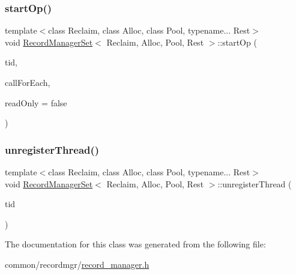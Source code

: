 \mbox{\label{classRecordManagerSet_a4cde1849fa081f1b83a82b3f77711ab9}} 
\subsubsection{\texorpdfstring{start\+Op()}{startOp()}}
{\footnotesize\ttfamily template$<$class Reclaim, class Alloc, class Pool, typename... Rest$>$ \\
void \hyperlink{classRecordManagerSet}{Record\+Manager\+Set}$<$ Reclaim, Alloc, Pool, Rest $>$\+::start\+Op (\begin{DoxyParamCaption}\item[{const int}]{tid,  }\item[{const bool}]{call\+For\+Each,  }\item[{const bool}]{read\+Only = {\ttfamily false} }\end{DoxyParamCaption})\hspace{0.3cm}{\ttfamily [inline]}}

\mbox{\label{classRecordManagerSet_ac56766fc083cf2e80afb190e677c9a48}} 
\subsubsection{\texorpdfstring{unregister\+Thread()}{unregisterThread()}}
{\footnotesize\ttfamily template$<$class Reclaim, class Alloc, class Pool, typename... Rest$>$ \\
void \hyperlink{classRecordManagerSet}{Record\+Manager\+Set}$<$ Reclaim, Alloc, Pool, Rest $>$\+::unregister\+Thread (\begin{DoxyParamCaption}\item[{const int}]{tid }\end{DoxyParamCaption})\hspace{0.3cm}{\ttfamily [inline]}}



The documentation for this class was generated from the following file\+:\begin{DoxyCompactItemize}
\item 
common/recordmgr/\hyperlink{record__manager_8h}{record\+\_\+manager.\+h}\end{DoxyCompactItemize}
